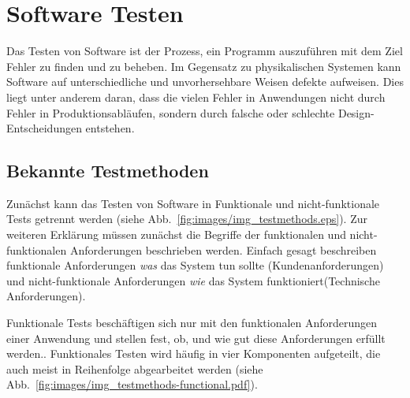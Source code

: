 \documentclass[12pt,a4paper,bibliography=totocnumbered,listof=totocnumbered]{scrartcl}
\begin{document}


\section{Software Testen}

Das Testen von Software ist der Prozess, ein Programm auszuführen mit dem Ziel Fehler zu finden und zu beheben. Im Gegensatz zu physikalischen Systemen kann Software auf unterschiedliche und unvorhersehbare Weisen defekte aufweisen. Dies liegt unter anderem daran, dass die vielen Fehler in Anwendungen nicht durch Fehler in Produktionsabläufen, sondern durch falsche oder schlechte Design-Entscheidungen entstehen.\cite{pantesting}

\subsection{Bekannte Testmethoden}\label{ch:soft-test}

Zunächst kann das Testen von Software in Funktionale und nicht-funktionale Tests getrennt werden (siehe Abb.~\ref{fig:images/img_testmethods.eps}). Zur weiteren Erklärung müssen zunächst die Begriffe der funktionalen und nicht-funktionalen Anforderungen beschrieben werden. Einfach gesagt beschreiben funktionale Anforderungen \textit{was} das System tun sollte (Kundenanforderungen) und nicht-funktionale Anforderungen \textit{wie} das System funktioniert(Technische Anforderungen).\cite{erikssonreq}


Funktionale Tests beschäftigen sich nur mit den funktionalen Anforderungen einer Anwendung und stellen fest, ob, und wie gut diese Anforderungen erfüllt werden.\cite{erikssontesting}. Funktionales Testen wird häufig in vier Komponenten aufgeteilt, die auch meist in Reihenfolge abgearbeitet werden (siehe Abb.~\ref{fig:images/img_testmethods-functional.pdf}).\cite{inflectra}
\end{document}
